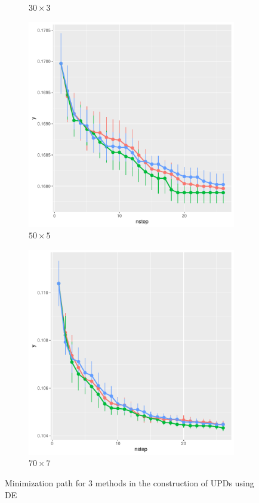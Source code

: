 \documentclass [PhD] {package/uclathes}
\begin{document}
\begin{figure}
\begin{subfigure}[b]{.3\textwidth}
\caption{$30\times 3$}
\end{subfigure}
\begin{subfigure}[b]{.3\textwidth}
\centering
\includegraphics[]{chapters/RSO/pdfs/results50x5}
\caption{$50\times 5$}
\end{subfigure}
\begin{subfigure}[b]{.3\textwidth}
\centering
\includegraphics[]{chapters/RSO/pdfs/results70x7}
\caption{$70\times 7$}
\end{subfigure}
\caption{Minimization path for 3 methods in the construction of UPDs  using DE}
\label{fig:line_upd}

\end{figure}
\end{document}
